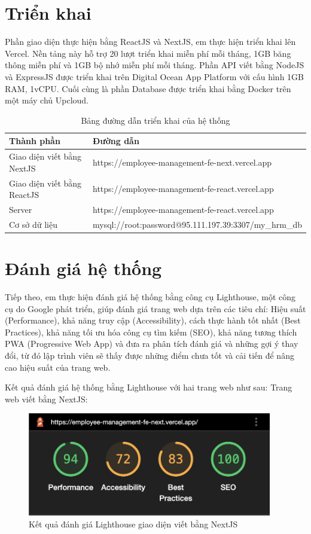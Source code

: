 \documentclass[../DoAn.tex]{subfiles}
\begin{document}
\section{Triển khai}
Phần giao diện thực hiện bằng ReactJS và NextJS, em thực hiện triển khai lên Vercel. Nền tảng này hỗ trợ 20 lượt triển khai miễn phí mỗi tháng, 1GB băng thông miễn phí và 1GB bộ nhớ miễn phí mỗi tháng. Phần API viết bằng NodeJS và ExpressJS được triển khai trên Digital Ocean App Platform với cấu hình 1GB RAM, 1vCPU. Cuối cùng là phần Database được triển khai bằng Docker trên một máy chủ Upcloud.

\begin{longtable}{|p{}|p{}|}
\caption{Bảng đường dẫn triển khai của hệ thống}
\hline
\textbf{Thành phần} & \textbf{Đường dẫn} \\ \hline
Giao diện viết bằng NextJS & https://employee-management-fe-next.vercel.app \\ \hline
Giao diện viết bằng ReactJS & https://employee-management-fe-react.vercel.app \\ \hline
Server & https://employee-management-fe-react.vercel.app \\ \hline
Cơ sở dữ liệu & mysql://root:password@95.111.197.39:3307/my\_hrm\_db \\ \hline
\end{longtable}

\section{Đánh giá hệ thống}
Tiếp theo, em thực hiện đánh giá hệ thống bằng công cụ Lighthouse, một công cụ do Google phát triển, giúp đánh giá trang web dựa trên các tiêu chí: Hiệu suất (Performance), khả năng truy cập (Accessibility), cách thực hành tốt nhất (Best Practices), khả năng tối ưu hóa công cụ tìm kiếm (SEO), khả năng tương thích PWA (Progressive Web App) và đưa ra phân tích đánh giá và những gợi ý thay đổi, từ đó lập trình viên sẽ thấy được những điểm chưa tốt và cải tiến để nâng cao hiệu suất của trang web.

Kết quả đánh giá hệ thống bằng Lighthouse với hai trang web như sau:
Trang web viết bằng NextJS:
\begin{figure}[H]
    \centering
    \includegraphics[width=0.95\textwidth]{Hinhve/LightHouseNext.png}
    \caption{Kết quả đánh giá Lighthouse giao diện viết bằng NextJS}
\end{figure}
\end{document}
